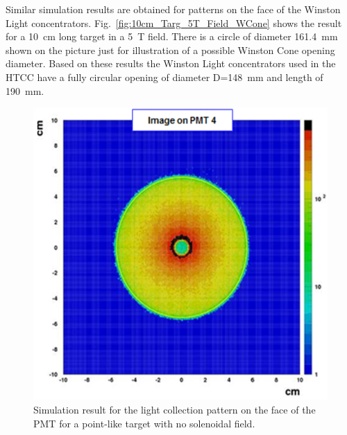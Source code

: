 Similar simulation results are obtained for patterns on the face of the
Winston Light concentrators. Fig.~\ref{fig:10cm_Targ_5T_Field_WCone} shows the result for a 10~cm long target
in a 5~T field. There is a circle of diameter 161.4~mm shown on the picture just for illustration of a possible Winston
Cone opening diameter. Based on these results the Winston Light concentrators used in the HTCC have a fully circular
opening of diameter D=148~mm and length of 190~mm. 

\begin{figure}[!ht]
    \centering
    \includegraphics[width=1.0\linewidth,trim={0.0cm 0.0cm 0.0cm 0.0cm},clip]{images/Point_Targ_Zero_Field_PMT.png}
    \caption{Simulation result for the light collection pattern on the face of the PMT for a point-like target with no
      solenoidal field.}
    \label{fig:Point_Targ_Zero_Field_PMT}
\end{figure}


